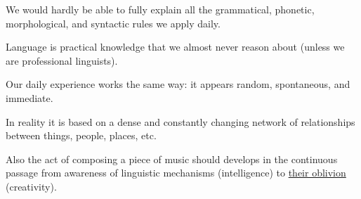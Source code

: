 We would hardly be able to fully explain all the grammatical, phonetic, morphological, and syntactic rules we apply daily.

Language is practical knowledge that we almost never reason about (unless we are professional linguists).

Our daily experience works the same way: it appears random, spontaneous, and immediate.

In reality it is based on a dense and constantly changing network of relationships between things, people, places, etc.

Also the act of composing a piece of music should develops in the continuous passage from awareness of linguistic mechanisms (intelligence) to \href{https://github.com/musicaecodice/EMC/blob/main/1_premises/suoni/senso1.mp4}{their oblivion} (creativity).